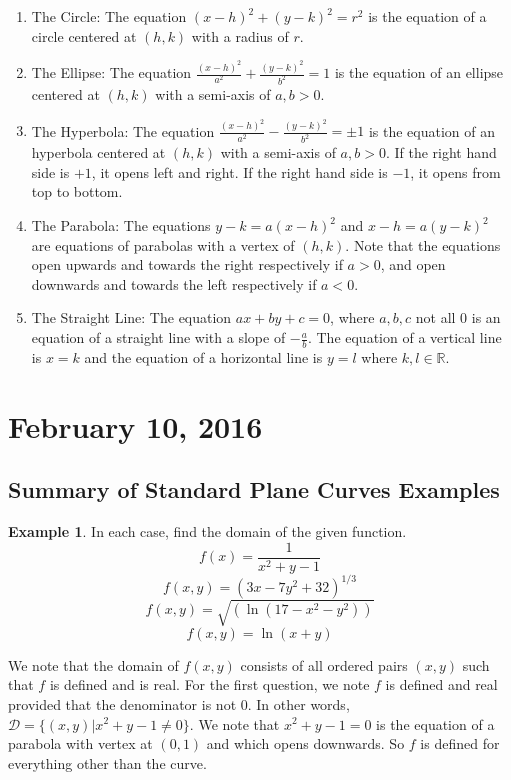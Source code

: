 \documentclass[11pt]{article}
\theoremstyle{plain} %
\theoremstyle{definition}
\theoremstyle{example}
\newtheorem*{example}{Example}
\theoremstyle{remark}
\begin{document}
\begin{enumerate}
	\item The Circle: The equation $(x-h)^2 + (y-k)^2 = r^2$ is the equation of a circle centered at $(h,k)$ with a radius of $r$.
	\item The Ellipse: The equation $\frac{(x-h)^2}{a^2} + \frac{(y-k)^2}{b^2} = 1$ is the equation of an ellipse centered at $(h,k)$ with a semi-axis of $a, b>0$.
	\item The Hyperbola: The equation $\frac{(x-h)^2}{a^2} - \frac{(y-k)^2}{b^2} = \pm 1$ is the equation of an hyperbola centered at $(h,k)$ with a semi-axis of $a, b>0$. If the right hand side is $+1$, it opens left and right. If the right hand side is $-1$, it opens from top to bottom.
	\item The Parabola: The equations $y-k = a(x-h)^2$ and $x-h = a(y-k)^2$ are equations of parabolas with a vertex of $(h,k)$. Note that the equations open upwards and towards the right respectively if $a>0$, and open downwards and towards the left respectively if $a<0$.
	\item The Straight Line: 	The equation $ax+by+c=0$, where $a, b, c$ not all 0 is an equation of a straight line with a slope of $-\frac{a}{b}$. The equation of a vertical line is $x=k$ and the equation of a horizontal line is $y=l$ where $k, l \in \mathbb R$.	

\end{enumerate}










\section{February 10, 2016}
\subsection{Summary of Standard Plane Curves Examples}

\begin{example}
In each case, find the domain of the given function. $$f(x) = \frac{1}{x^2+y-1}$$
$$f(x,y) = \left(3x-7y^2+32 \right)^{1/3}$$
$$f(x,y) = \sqrt{\left(\ln \left(17 -x^2-y^2 \right)\right)}$$
$$f(x,y) = \ln (x+y)$$


\end{example}

We note that the domain of $f(x,y)$ consists of all ordered pairs $(x,y)$ such that $f$ is defined and is real. For the first question, we note $f$ is defined and real provided that the denominator is not 0. In other words, $\mathcal D = \{(x, y) | x^2+y-1 \neq 0 \}$. We note that $x^2+y-1 = 0$ is the equation of a parabola with vertex at $(0,1)$ and which opens downwards. So $f$ is defined for everything other than the curve. 
\end{document}
